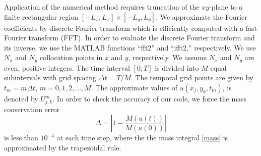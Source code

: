 \documentclass[10pt]{article}
\numberwithin{equation}{section}
\begin{document}
	\par Application of the numerical method requires truncation of the  $xy$-plane  to a
	finite rectangular region  $[-L_x, L_x]\times [-L_y, L_y]$. We approximate the Fourier coefficients by
	discrete Fourier transform which is efficiently computed
	with a fast Fourier transform (FFT).   In order to evaluate the discrete Fourier transform and its inverse, we use the MATLAB functions “fft2” and “ifft2,” respectively.  We use $N_x$ and $N_y$  collocation points in $x$ and $y$, respectively. We assume $N_x$ and $N_y$ are even, positive integers. 
	The time interval $[0, T]$ is divided into $M$ equal
	subintervals with grid spacing $\Delta t=T/M$. The temporal grid points are given by
	$t_{m}=m \Delta t$,  $m=0,1,2,...,M$. The approximate values of $u(x_{j}, y_{k}, t_{m})$,
	is denoted by $U_{j,k}^{m}$.  In order to check the accuracy of our code, we force the  mass conservation error 
	\begin{equation}
		\Delta= \left| 1 -\frac{M(u(t))}{M(u(0))} \right|
	\end{equation}
	is less than $10^{-4}$ at each time step, where  the  the mass integral \eqref{mass}
	is approximated by the trapezoidal rule. 
\end{document}
